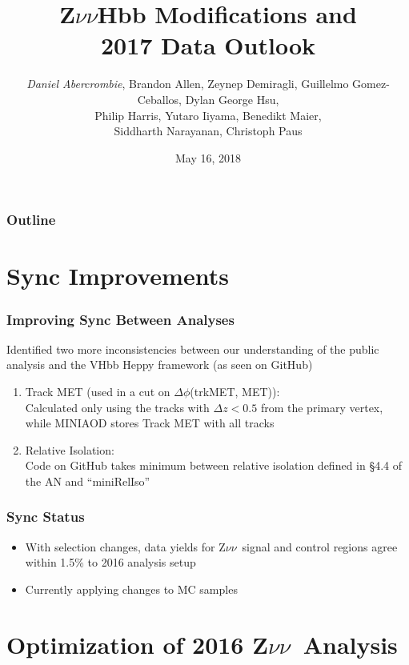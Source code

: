 \documentclass{beamer}
\author[D. Abercrombie]{
  \emph{Daniel Abercrombie}, Brandon Allen, Zeynep Demiragli,
  Guillelmo Gomez-Ceballos, Dylan George Hsu, \\
  Philip Harris, Yutaro Iiyama, Benedikt Maier, \\
  Siddharth Narayanan, Christoph Paus
}
\title{\bf \sffamily Z$\nu\nu$Hbb Modifications and \\ 2017 Data Outlook}
\date{May 16, 2018}
\newcommand{\Znn}{Z$\nu\nu$~}
\begin{document}
\begin{frame}[nonumbering]
  \titlepage
\end{frame}

\begin{frame}
  \frametitle{Outline}
  \tableofcontents
\end{frame}

\section{Sync Improvements}

\begin{frame}
  \frametitle{Improving Sync Between Analyses}

  Identified two more inconsistencies between our understanding of the public analysis
  and the VHbb Heppy framework (as seen on GitHub)

  \begin{enumerate}
  \item Track MET (used in a cut on $\Delta\phi$(trkMET, MET)): \\
    Calculated only using the tracks with $\Delta z < 0.5$ from the primary vertex,
    while MINIAOD stores Track MET with all tracks
  \item Relative Isolation: \\
    Code on GitHub takes minimum between relative isolation
    defined in \S4.4 of the AN and ``miniRelIso''
  \end{enumerate}

\end{frame}

\begin{frame}
  \frametitle{Sync Status}

  \begin{itemize}
  \item With selection changes, data yields for \Znn signal and
    control regions agree within 1.5\% to 2016 analysis setup
  \item Currently applying changes to MC samples
  \end{itemize}

\end{frame}

\section{Optimization of 2016 \Znn Analysis}
\end{document}
